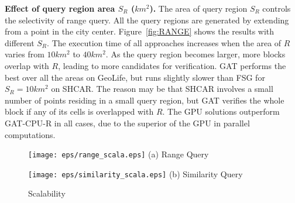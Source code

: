 \documentclass[10pt,conference,letterpaper]{IEEEtran}
\newcommand{\frname}{GAT\xspace }
\begin{document}



\vspace{0.1cm}\textbf{Effect of query region area $S_R$ ($km^2$).}
The area of query region $S_{R}$ controls the selectivity of range query. All the query regions are generated by extending from a point in the city center. Figure~\ref{fig:RANGE} shows the results with different $S_{R}$.
The execution time of all approaches increases when the area of $R$ varies from $10km^2$ to $40km^2$.
As the query region becomes larger, more blocks overlap with $R$, leading to more candidates for verification.
\frname performs the best over all the areas on GeoLife, but runs slightly slower than FSG for $S_R=10km^2$ on SHCAR. The reason may be that SHCAR involves a small number of points residing in a small query region, but \frname verifies the whole block if any of its cells is overlapped with $R$.
The GPU solutions outperform \frname-CPU-R in all cases, due to the superior of the GPU in parallel computations.


\begin{figure}[t]\centering
	\scriptsize{
		\begin{minipage}{0.48\linewidth}
			\centering
			\texttt{[image: eps/range\_scala.eps]}
			(a) Range Query
		\end{minipage}
		\hfill
		\begin{minipage}{0.48\linewidth}
			\centering
			\texttt{[image: eps/similarity\_scala.eps]}
			(b) Similarity Query
		\end{minipage}
	}
	\caption{Scalability\label{fig:Scalability}}
	\vspace{-.1in}
\end{figure}
\end{document}

